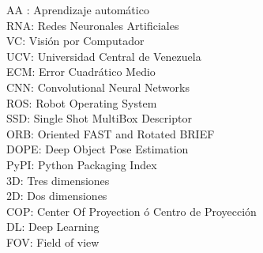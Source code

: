 AA : Aprendizaje automático \\
RNA: Redes Neuronales Artificiales \\
VC: Visión por Computador\\
UCV: Universidad Central de Venezuela\\
ECM: Error Cuadrático Medio \\
CNN: Convolutional Neural Networks\\
ROS: Robot Operating System\\
SSD: Single Shot MultiBox Descriptor\\
ORB: Oriented FAST and Rotated BRIEF\\
DOPE: Deep Object Pose Estimation \\
PyPI: Python Packaging Index \\
3D: Tres dimensiones\\
2D: Dos dimensiones \\
COP: Center Of Proyection ó Centro de Proyección\\
DL: Deep Learning \\
FOV: Field of view\\